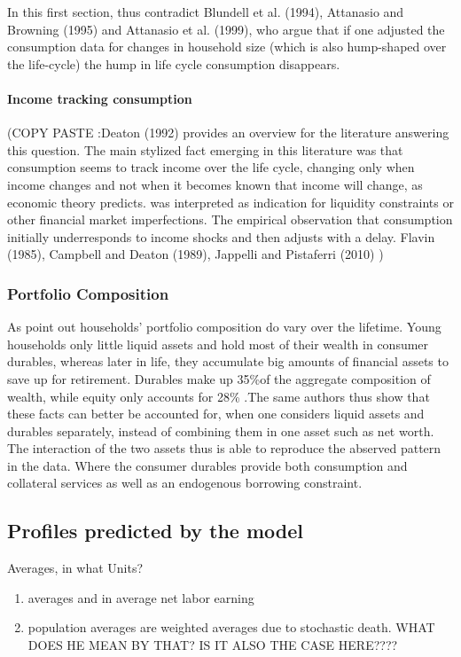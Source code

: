\documentclass[a4paper,12pt]{article}
\begin{document}
In this first section, \cite{FV&K2011} thus contradict Blundell et al. (1994), Attanasio and Browning (1995) and Attanasio et al. (1999), who argue that if one adjusted the consumption data for changes in household size (which is also hump-shaped over the life-cycle) the hump in life cycle consumption disappears. 

\paragraph{Income tracking consumption}

(COPY PASTE :Deaton (1992) provides an overview for the literature answering this question. The main stylized fact emerging in this literature was that consumption seems to track income over the life cycle, changing only when income changes and not when it becomes known that income will change, as economic theory predicts. was interpreted as indication for liquidity constraints or other financial market imperfections. The empirical observation that consumption initially underresponds to income shocks and then adjusts with a delay. Flavin (1985), Campbell and Deaton (1989), Jappelli and Pistaferri (2010) )

\subsubsection{Portfolio Composition} 
As \cite{FV&K2011} point out households' portfolio composition do vary over the lifetime. Young households only little liquid assets and hold most of their wealth in consumer durables, whereas later in life, they accumulate big amounts of financial assets to save up for retirement. Durables make up 35\%of the aggregate composition of wealth, while equity only accounts for 28\% \citep{FV&K2011}.The same authors thus show that these facts can better be accounted for, when one considers liquid assets and durables separately, instead of combining them in one asset such as net worth. The interaction of the two assets thus is able to reproduce the abserved pattern in the data. Where the consumer durables provide both consumption and collateral services as well as an endogenous borrowing constraint. 

\subsection{Profiles predicted by the model}
Averages, in what Units?
\begin{enumerate}
\item \cite{hintermaier2016} averages and in average net labor earning
\item \citep{FV&K2011} population averages are weighted averages due to stochastic death. WHAT DOES HE MEAN BY THAT? IS IT ALSO THE CASE HERE????
\end{enumerate}
\end{document}
